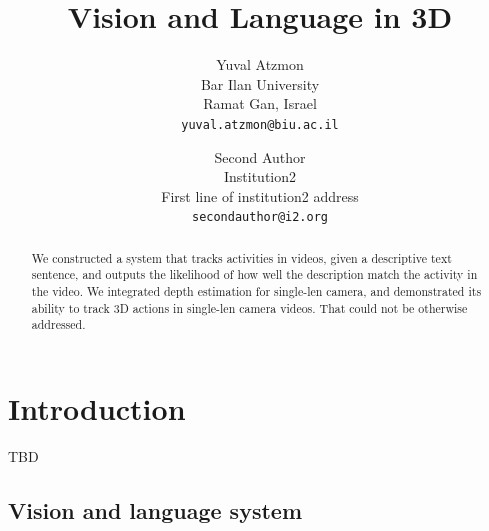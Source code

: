 \documentclass[10pt,twocolumn,letterpaper]{article}
\begin{document}
\title{Vision and Language in 3D}

\author{Yuval Atzmon\\
Bar Ilan University\\
Ramat Gan, Israel\\
{\tt\small yuval.atzmon@biu.ac.il}
\and
Second Author\\
Institution2\\
First line of institution2 address\\
{\tt\small secondauthor@i2.org}
}

\maketitle

\begin{abstract}
 We constructed a system that tracks activities in videos, given a descriptive text sentence, and outputs the likelihood of how well the description match the activity in the video. We integrated depth estimation for single-len camera, and demonstrated its ability to track 3D actions in single-len camera videos. That could not be otherwise addressed. 
 

\end{abstract}

\section{Introduction}

TBD

\subsection{Vision and language system}
\end{document}
